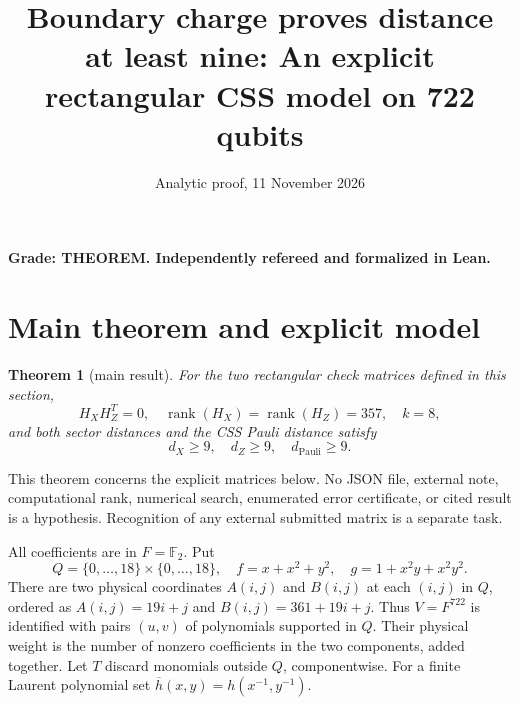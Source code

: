 \documentclass{article}
\title{Boundary charge proves distance at least nine: An explicit rectangular CSS model on 722 qubits}
\author{}
\date{Analytic proof, 11 November 2026}
\newtheorem{theorem}{Theorem}
\DeclareMathOperator{\rank}{rank}
\begin{document}
\maketitle

\textbf{Grade: THEOREM. Independently refereed and formalized in Lean.}

\section{Main theorem and explicit model}\label{sec:model}

\begin{theorem}[main result]\label{thm:main}
  For the two rectangular check matrices defined in this section,
  \begin{equation}
    H_X H_Z^T = 0, \quad
    \rank(H_X) = \rank(H_Z) = 357, \quad k = 8,
  \end{equation}
  and both sector distances and the CSS Pauli distance satisfy
  \begin{equation}
    d_X \ge 9, \quad d_Z \ge 9, \quad d_{\text{Pauli}} \ge 9.
  \end{equation}
\end{theorem}

This theorem concerns the explicit matrices below. No JSON file, external note,
computational rank, numerical search, enumerated error certificate, or cited result is a
hypothesis. Recognition of any external submitted matrix is a separate task.

All coefficients are in \(F = \mathbb{F}_2\). Put
\begin{equation}
  Q = \{0, \dots, 18\} \times \{0, \dots, 18\}, \quad
  f = x + x^2 + y^2, \quad g = 1 + x^2 y + x^2 y^2.
\end{equation}
There are two physical coordinates \(A(i,j)\) and \(B(i,j)\) at each \((i,j)\) in \(Q\),
ordered as \(A(i,j) = 19i + j\) and \(B(i,j) = 361 + 19i + j\). Thus \(V = F^{722}\) is
identified with pairs \((u, v)\) of polynomials supported in \(Q\). Their physical weight is
the number of nonzero coefficients in the two components, added together. Let \(T\) discard
monomials outside \(Q\), componentwise. For a finite Laurent polynomial set
\(\overline{h}(x,y) = h(x^{-1}, y^{-1})\).
\end{document}
